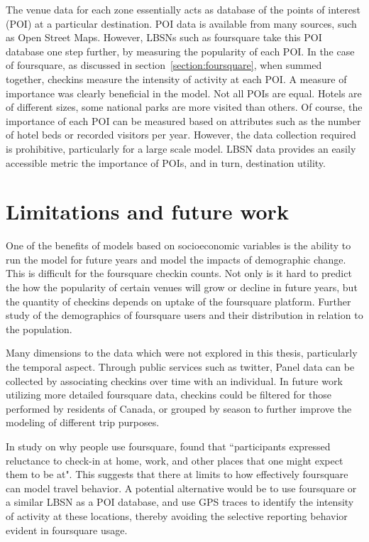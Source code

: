 The venue data for each zone essentially acts as database of the points of interest (POI) at a particular destination. POI data is available from many sources, such as Open Street Maps. However, LBSNs such as foursquare take this POI database one step further, by measuring the popularity of each POI. In the case of foursquare, as discussed in section~\ref{section:foursquare}, when summed together, checkins measure the intensity of activity at each POI. A measure of importance was clearly beneficial in the model. Not all POIs are equal. Hotels are of different sizes, some national parks are more visited than others. Of course, the importance of each POI can be measured based on attributes such as the number of hotel beds or recorded visitors per year. However, the data collection required is prohibitive, particularly for a large scale model. LBSN data provides an easily accessible metric the importance of POIs, and in turn, destination utility. 

\section{Limitations and future work}
One of the benefits of models based on socioeconomic variables is the ability to run the model for future years and model the impacts of demographic change. This is difficult for the foursquare checkin counts. Not only is it hard to predict the how the popularity of certain venues will grow or decline in future years, but the quantity of checkins depends on uptake of the foursquare platform. Further study of the demographics of foursquare users and their distribution in relation to the population. 

Many dimensions to the data which were not explored in this thesis,  particularly the temporal aspect. Through public services such as twitter, Panel data can be collected by associating checkins over time with an individual. In future work utilizing more detailed foursquare data, checkins could be filtered for those performed by residents of Canada, or grouped by season to further improve the modeling of different trip purposes.

In study on why people use foursquare, \textcite{lindqvist2011m} found that ``participants expressed reluctance to check-in at home, work, and other places that one might expect them to be at". This suggests that there at limits to how effectively foursquare can model travel behavior. A potential alternative would be to use foursquare or a similar LBSN as a POI database, and use GPS traces to identify the intensity of activity at these locations, thereby avoiding the selective reporting behavior evident in foursquare usage.


